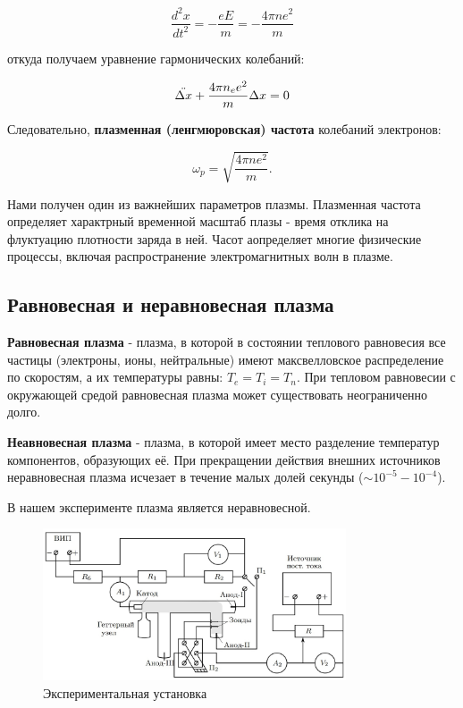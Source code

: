 \documentclass[11pt]{article}
\begin{document}
    
\[
\dfrac{d^2x}{dt^2}=-\dfrac{eE}{m}=-\dfrac{4\pi n e^2}{m}
\]

    откуда получаем уравнение гармонических колебаний:
    
\[\Ddot{\Delta x} + \frac{4 \pi n_e e^2}{m} \Delta x = 0 \]


    Следовательно, \textbf{плазменная (ленгмюровская) частота} колебаний электронов:
    
\begin{equation}
\omega_p = \sqrt{\dfrac{4\pi ne^2}{m}}.
\end{equation}

    Нами получен один из важнейших параметров плазмы. Плазменная частота определяет характрный временной масштаб плазы - время отклика на флуктуацию плотности заряда в ней. Часот аопределяет многие физические процессы, включая распространение электромагнитных волн в плазме.


\subsection*{Равновесная и неравновесная плазма}

    \textbf{Равновесная плазма} - плазма, в которой в состоянии теплового равновесия все частицы (электроны, ионы, нейтральные) имеют максвелловское распределение по скоростям, а их температуры равны: $T_e = T_i = T_n$.
    При тепловом равновесии с окружающей средой равновесная плазма может существовать неограниченно долго.


    \textbf{Неавновесная плазма} - плазма, в которой имеет место разделение температур компонентов, образующих её. При прекращении действия внешних источников неравновесная плазма исчезает в течение малых долей секунды ($\sim 10^{-5} - 10^{-4}$).


    В нашем эксперименте плазма является неравновесной.


\begin{figure}[H]
    \centering
    \includegraphics[width=0.8\textwidth]{sheme_351.jpg}
    \caption{Экспериментальная установка}
    \label{spec_1}
\end{figure}
\end{document}
